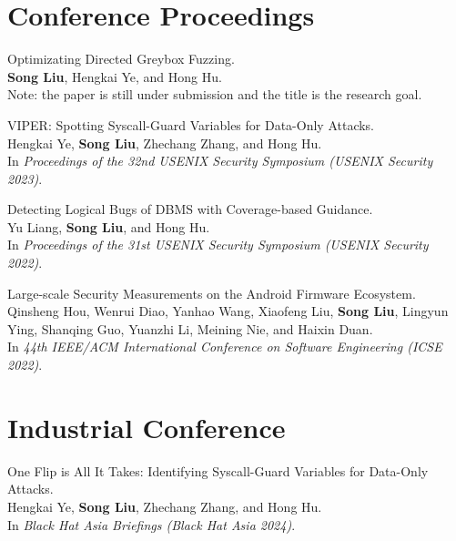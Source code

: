 \documentclass[letterpaper,10pt]{article}
\newcommand{\shorterSection}[1]{\vspace{-10pt}\section{#1}}
\begin{document}
\shorterSection{\textcolor{titleblue}{Conference Proceedings}}
  \begin{enumerate}[label={[\arabic*]}]

    \item Optimizating Directed Greybox Fuzzing. \\
          \textbf{Song Liu}, Hengkai Ye, and Hong Hu. \\
          Note: the paper is still under submission and the title is the research goal.

    \item VIPER: Spotting Syscall-Guard Variables for Data-Only Attacks. \\
          Hengkai Ye, \textbf{Song Liu}, Zhechang Zhang, and Hong Hu. \\
          In \textit{Proceedings of the 32nd USENIX Security Symposium (USENIX Security 2023)}.

      
    \item Detecting Logical Bugs of DBMS with Coverage-based Guidance. \\
          Yu Liang, \textbf{Song Liu}, and Hong Hu. \\
          In \textit{Proceedings of the 31st USENIX Security Symposium (USENIX Security 2022)}.

    \item Large-scale Security Measurements on the Android Firmware Ecosystem. \\
          Qinsheng Hou, Wenrui Diao, Yanhao Wang, Xiaofeng Liu, \textbf{Song Liu}, Lingyun Ying, Shanqing Guo, Yuanzhi Li, Meining Nie, and Haixin Duan. \\
          In \textit{44th IEEE/ACM International Conference on Software Engineering (ICSE 2022)}.

  \end{enumerate}

\shorterSection{\textcolor{titleblue}{Industrial Conference}}
  \begin{enumerate}[label={[\arabic*]}]
    \item One Flip is All It Takes: Identifying Syscall-Guard Variables for Data-Only Attacks. \\
          Hengkai Ye, \textbf{Song Liu}, Zhechang Zhang, and Hong Hu. \\
          In \textit{Black Hat Asia Briefings (Black Hat Asia 2024)}.
  \end{enumerate}
\end{document}
